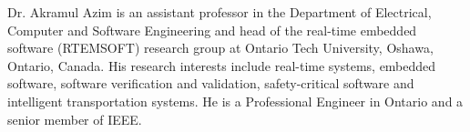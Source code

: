 \documentclass{ieeeaccess}
\begin{document}
\begin{IEEEbiography}{Dr.
		Akramul Azim}
	is an assistant professor in the Department of Electrical, Computer and 
	Software Engineering and head of the real-time embedded software (RTEMSOFT) 
	research group at Ontario Tech University, 
	Oshawa, Ontario, Canada. His research interests include real-time systems, 
	embedded software, software verification and validation, safety-critical 
	software and intelligent transportation systems. He is a Professional Engineer 
	in Ontario and a senior member of IEEE.
\end{IEEEbiography}


\EOD
\end{document}
